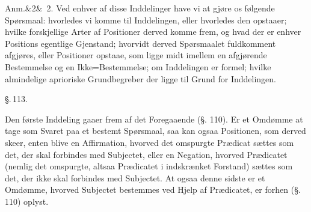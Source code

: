 \documentclass[12pt]{book}
\def\sperr#1{#1}%
\def\textit#1{#1}%
\def\emph#1{#1}%
\newcommand{\sperr}[1]{\textls[180]{#1}}
\newcommand{\parag}[1]{%
  \par\vspace{0.9\baselineskip}%
  {\centering\textit{\S.\,#1.}\par}%
  \vspace{0.35\baselineskip}%
  \noindent\hspace{\parindent}\ignorespaces
}
\newcommand{\anm}[1]{%
  \par\vspace{0.5\baselineskip}%
  \noindent\hspace{\parindent}\sperr{Anm.}\ifx&#1&\else~\textit{#1}.\fi
  \enspace\ignorespaces
}
\newcommand{\opage}[1]{\marginnote{\footnotesize\textit{[#1]}}}
\begin{document}
\anm{2} Ved enhver af disse Inddelinger have vi at gjøre os følgende Spørsmaal: hvorledes
vi komme til Inddelingen, eller hvorledes den opstaaer; hvilke forskjellige Arter af
Positioner derved komme frem, og hvad der er enhver Positions egentlige Gjenstand; hvorvidt
derved Spørsmaalet fuldkomment afgjøres, eller Positioner opstaae, som ligge midt imellem
en afgjørende Bestemmelse og en Ikke=Bestemmelse; om Inddelingen er formel; hvilke
almindelige aprioriske Grundbegreber der ligge til Grund for Inddelingen.

\opage{271} \parag{113}

Den første Inddeling gaaer frem af det Foregaaende (§. 110). Er et Omdømme at tage som
Svaret paa et bestemt Spørsmaal, saa kan ogsaa Positionen, som derved skeer, enten blive en
\emph{Affirmation}, hvorved det omspurgte Prædicat sættes som det, der skal forbindes med
Subjectet, eller en \emph{Negation}, hvorved Prædicatet (nemlig det omspurgte, altsaa
Prædicatet i indskrænket Forstand) sættes som det, der ikke skal forbindes med Subjectet.
At ogsaa denne sidste er et Omdømme, hvorved Subjectet bestemmes ved Hjelp af Prædicatet,
er forhen (§. 110) oplyst.
\end{document}
